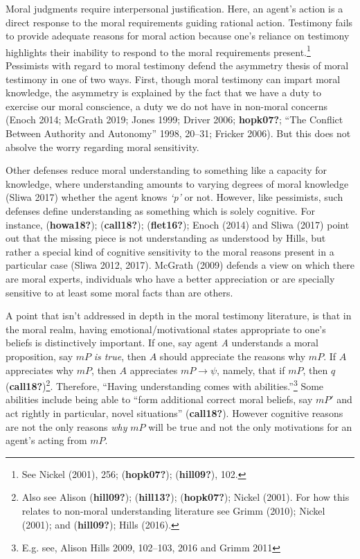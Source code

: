 \documentclass[12pt]{book}
\theoremstyle{definition}
\theoremstyle{remark}
\begin{document}
Moral judgments require interpersonal justification. Here, an agent's action is a direct response to the moral requirements guiding rational action. Testimony fails to provide adequate reasons for moral action because one's reliance on testimony highlights their inability to respond to the moral requirements present.\footnote{See Nickel (2001), 256; (\textbf{hopk07?}); (\textbf{hill09?}), 102.} Pessimists with regard to moral testimony defend the asymmetry thesis of moral testimony in one of two ways. First, though moral testimony can impart moral knowledge, the asymmetry is explained by the fact that we have a duty to exercise our moral conscience, a duty we do not have in non-moral concerns (Enoch 2014; McGrath 2019; Jones 1999; Driver 2006; \textbf{hopk07?}; {``The {Conflict Between Authority} and {Autonomy}''} 1998, 20--31; Fricker 2006). But this does not absolve the worry regarding moral sensitivity.

Other defenses reduce moral understanding to something like a capacity for knowledge, where understanding amounts to varying degrees of moral knowledge (Sliwa 2017) whether the agent knows \emph{`p'} or not. However, like pessimists, such defenses define understanding as something which is solely cognitive. For instance, (\textbf{howa18?}); (\textbf{call18?}); (\textbf{flet16?}); Enoch (2014) and Sliwa (2017) point out that the missing piece is not understanding as understood by Hills, but rather a special kind of cognitive sensitivity to the moral reasons present in a particular case (Sliwa 2012, 2017). McGrath (2009) defends a view on which there are moral experts, individuals who have a better appreciation or are specially sensitive to at least some moral facts than are others.

A point that isn't addressed in depth in the moral testimony literature, is that in the moral realm, having emotional/motivational states appropriate to one's beliefs is distinctively important. If one, say agent \emph{A} understands a moral proposition, say \(mP\) \emph{is true}, then \(A\) should appreciate the reasons why \(mP\). If \(A\) appreciates why \(mP\), then \(A\) appreciates \(mP \rightarrow \psi\), namely, that if \(mP\), then \(q\) (\textbf{call18?})\footnote{Also see Alison (\textbf{hill09?}); (\textbf{hill13?}); (\textbf{hopk07?}); Nickel (2001). For how this relates to non-moral understanding literature see Grimm (2010); Nickel (2001); and (\textbf{hill09?}); Hills (2016).}. Therefore, ``Having understanding comes with abilities.''\footnote{E.g. see, Alison Hills 2009, 102--103, 2016 and Grimm 2011} Some abilities include being able to ``form additional correct moral beliefs, say \(mP'\) and act rightly in particular, novel situations'' (\textbf{call18?}). However cognitive reasons are not the only reasons \emph{why} \(mP\) will be true and not the only motivations for an agent's acting from \(mP\).
\end{document}
